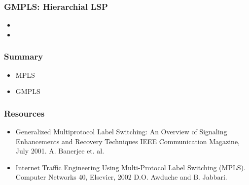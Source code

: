 \documentclass[12pt]{beamer}
\begin{document}
\begin{frame}

\end{frame}


\begin{frame}
  \frametitle{GMPLS: Hierarchial LSP}

  \begin{itemize}
  \item 
  \item 
  \end{itemize}
\end{frame}




\begin{frame}
  \frametitle{Summary}
  \begin{itemize}
  \item MPLS
  \item GMPLS
  \end{itemize}
\end{frame}

\begin{frame}
  \frametitle{Resources}
  \begin{itemize}
  \item Generalized Multiprotocol Label Switching: An Overview of Signaling Enhancements and Recovery Techniques
IEEE Communication Magazine, July 2001.
A. Banerjee et. al. 
  \item Internet Traffic Engineering Using Multi-Protocol Label Switching (MPLS).
Computer Networks 40, Elsevier, 2002
D.O. Awduche and B. Jabbari. 
  \end{itemize}
\end{frame}
\end{document}
